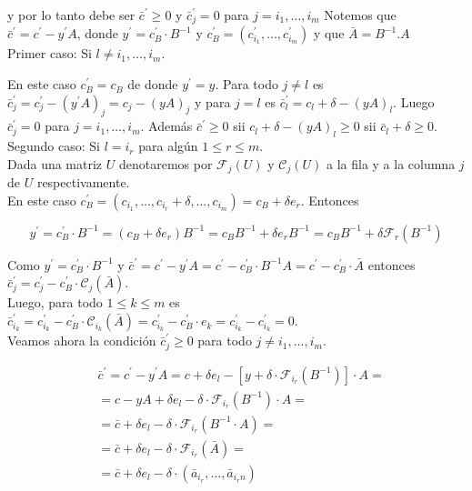 \documentclass[10pt]{article}
\begin{document}
y por lo tanto debe ser $\bar{c}^{\prime} \geq 0$ y $\bar{c}_{j}^{\prime}=0$ para $j=i_{1}, \ldots, i_{m}$ Notemos que $\bar{c}^{\prime}=c^{\prime}-y^{\prime} A$, donde $y^{\prime}=c_{B}^{\prime} \cdot B^{-1}$ y $c_{B}^{\prime}=\left(c_{i_{1}}^{\prime}, \ldots, c_{i_{m}}^{\prime}\right)$ y que $\bar{A}=B^{-1} . A$\\
Primer caso: Si $l \neq i_{1}, \ldots, i_{m}$.

En este caso $c_{B}^{\prime}=c_{B}$ de donde $y^{\prime}=y$. Para todo $j \neq l$ es $\bar{c}_{j}^{\prime}=c_{j}^{\prime}-\left(y^{\prime} A\right)_{j}=c_{j}-(y A)_{j}$ y para $j=l$ es $\bar{c}_{l}^{\prime}=c_{l}+\delta-(y A)_{l}$. Luego $\bar{c}_{j}^{\prime}=0$ para $j=i_{1}, \ldots, i_{m}$. Además $\bar{c}^{\prime} \geq 0$ sii $c_{l}+\delta-(y A)_{l} \geq 0$ sii $\bar{c}_{l}+\delta \geq 0$.\\
Segundo caso: Si $l=i_{r}$ para algún $1 \leq r \leq m$.\\
Dada una matriz $U$ denotaremos por $\mathcal{F}_{j}(U)$ y $\mathcal{C}_{j}(U)$ a la fila y a la columna $j$ de $U$ respectivamente.\\
En este caso $c_{B}^{\prime}=\left(c_{i_{1}}, \ldots, c_{i_{r}}+\delta, \ldots, c_{i_{m}}\right)=c_{B}+\delta e_{r}$. Entonces

$$
y^{\prime}=c_{B}^{\prime} \cdot B^{-1}=\left(c_{B}+\delta e_{r}\right) B^{-1}=c_{B} B^{-1}+\delta e_{r} B^{-1}=c_{B} B^{-1}+\delta \mathcal{F}_{r}\left(B^{-1}\right)
$$

Como $y^{\prime}=c_{B}^{\prime} \cdot B^{-1}$ y $\bar{c}^{\prime}=c^{\prime}-y^{\prime} A=c^{\prime}-c_{B}^{\prime} \cdot B^{-1} A=c^{\prime}-c_{B}^{\prime} \cdot \bar{A}$ entonces $\bar{c}_{j}^{\prime}=c_{j}^{\prime}-c_{B}^{\prime} \cdot \mathcal{C}_{j}(\bar{A})$.\\
Luego, para todo $1 \leq k \leq m$ es $\bar{c}_{i_{k}}^{\prime}=c_{i_{k}}^{\prime}-c_{B}^{\prime} \cdot \mathcal{C}_{i_{k}}(\bar{A})=c_{i_{k}}^{\prime}-c_{B}^{\prime} \cdot e_{k}=c_{i_{k}}^{\prime}-c_{i_{k}}^{\prime}=0$.\\
Veamos ahora la condición $\bar{c}_{j}^{\prime} \geq 0$ para todo $j \neq i_{1}, \ldots, i_{m}$.

$$
\begin{aligned}
& \bar{c}^{\prime}=c^{\prime}-y^{\prime} A=c+\delta e_{l}-\left[y+\delta \cdot \mathcal{F}_{i_{r}}\left(B^{-1}\right)\right] \cdot A= \\
& =c-y A+\delta e_{l}-\delta \cdot \mathcal{F}_{i_{r}}\left(B^{-1}\right) \cdot A= \\
& =\bar{c}+\delta e_{l}-\delta \cdot \mathcal{F}_{i_{r}}\left(B^{-1} \cdot A\right)= \\
& =\bar{c}+\delta e_{l}-\delta \cdot \mathcal{F}_{i_{r}}(\bar{A})= \\
& =\bar{c}+\delta e_{l}-\delta \cdot\left(\bar{a}_{i_{r}}, \ldots, \bar{a}_{i_{r} n}\right)
\end{aligned}
$$
\end{document}
